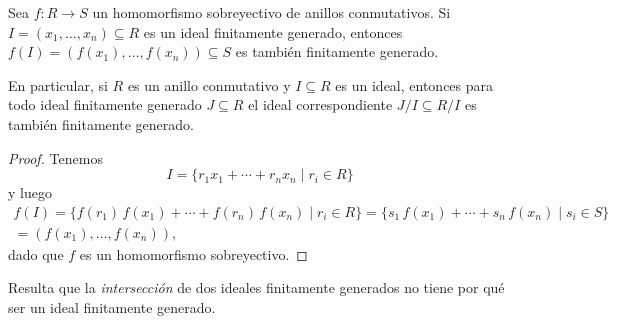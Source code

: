 \begin{observacion}
  \label{obs:imagen-sobre-de-ideal-fg}
  Sea $f\colon R\to S$ un homomorfismo sobreyectivo de anillos conmutativos.
  Si $I = (x_1,\ldots,x_n) \subseteq R$ es un ideal finitamente generado,
  entonces $f (I) = (f (x_1), \ldots, f (x_n)) \subseteq S$ es también
  finitamente generado.

  En particular, si $R$ es un anillo conmutativo y $I \subseteq R$ es un ideal,
  entonces para todo ideal finitamente generado $J \subseteq R$ el ideal
  correspondiente $J/I \subseteq R/I$ es también finitamente generado.

  \begin{proof}
    Tenemos
    $$I = \{ r_1 x_1 + \cdots + r_n x_n \mid r_i \in R \}$$
    y luego
    \begin{multline*}
      f (I) = \{ f (r_1)\,f (x_1) + \cdots + f (r_n)\,f (x_n) \mid r_i\in R \} =
      \{ s_1\,f (x_1) + \cdots + s_n\,f (x_n) \mid s_i \in S \} \\
      = (f (x_1), \ldots, f (x_n)),
    \end{multline*}
    dado que $f$ es un homomorfismo sobreyectivo.
  \end{proof}
\end{observacion}

Resulta que la \emph{intersección} de dos ideales finitamente generados no tiene
por qué ser un ideal finitamente generado.

